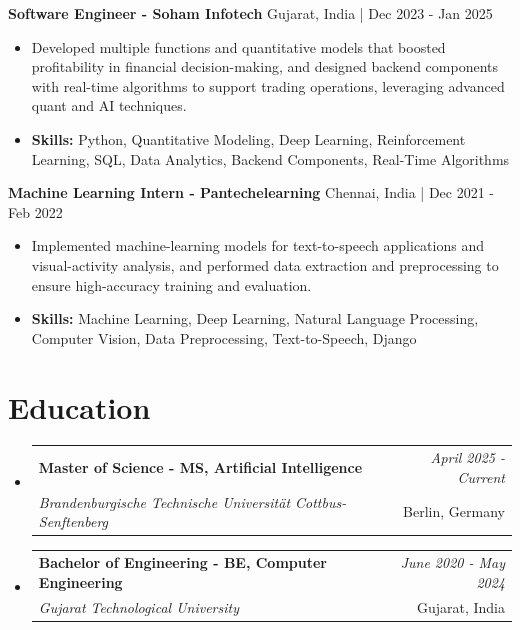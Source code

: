\documentclass[a4paper,11pt]{article}
\makeatletter
\newcommand{\resumeSubheading}[4]{
\vspace{0.5mm}\item
    \begin{tabular*}{\linewidth}[t]{l@{\extracolsep{\fill}}r}
        \textbf{#1} & \textit{\footnotesize{#4}} \\
        \textit{\footnotesize{#3}} &  \footnotesize{#2}\\
    \end{tabular*}
    \vspace{-2.4mm}
}
\makeatother
\begin{document}
\vspace{1mm}
  \textbf{Software Engineer - Soham Infotech} \hfill Gujarat, India | Dec 2023 - Jan 2025
\vspace{-1.5mm} %
\begin{itemize}
  \item Developed multiple functions and quantitative models that boosted profitability in financial decision-making, and designed backend components with real-time algorithms to support trading operations, leveraging advanced quant and AI techniques.

\vspace{-2mm}
  \item \textbf{Skills:} Python, Quantitative Modeling, Deep Learning, Reinforcement Learning, SQL, Data Analytics, Backend Components, Real-Time Algorithms
\end{itemize}

\vspace{1mm}
  \textbf{Machine Learning Intern - Pantechelearning} \hfill Chennai, India | Dec 2021 - Feb 2022
\vspace{-1.5mm} %
\begin{itemize}
  \item Implemented machine-learning models for text-to-speech applications and visual-activity analysis, and performed data extraction and preprocessing to ensure high-accuracy training and evaluation.
\vspace{-2mm}
  \item \textbf{Skills:} Machine Learning, Deep Learning, Natural Language Processing, Computer Vision, Data Preprocessing, Text-to-Speech, Django
\end{itemize}\section{\textbf{Education}}
\vspace{-0.4mm}

\begin{itemize}[leftmargin=0.15in, label={}]
\resumeSubheading
{Master of Science - MS, Artificial Intelligence }{Berlin, Germany}
{Brandenburgische Technische Universität Cottbus-Senftenberg  }{April 2025 - Current}

\vspace{1.0mm} %
\resumeSubheading
{Bachelor of Engineering - BE, Computer Engineering  }{Gujarat, India}
{Gujarat Technological University }{June 2020 - May 2024}

\end{itemize}
\end{document}
